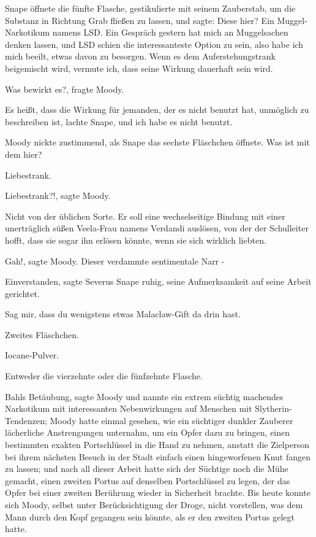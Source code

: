 Snape öffnete die fünfte Flasche, gestikulierte mit seinem Zauberstab, um die
Substanz in Richtung Grab fließen zu lassen, und sagte: \glqq{}Diese hier? Ein
Muggel-Narkotikum namens LSD. Ein Gespräch gestern hat mich an Muggelsachen
denken lassen, und LSD schien die interessanteste Option zu sein, also habe ich
mich beeilt, etwas davon zu besorgen. Wenn es dem Auferstehungstrank beigemischt
wird, vermute ich, dass seine Wirkung dauerhaft sein wird.\grqq{}

\glqq{}Was bewirkt es?\grqq{}, fragte Moody.

\glqq{}Es heißt, dass die Wirkung für jemanden, der es nicht benutzt hat,
unmöglich zu beschreiben ist\grqq{}, lachte Snape, \glqq{}und ich habe es nicht
benutzt.\grqq{}

Moody nickte zustimmend, als Snape das sechste Fläschchen öffnete. \glqq{}Was ist
mit dem hier?\grqq{}

\glqq{}Liebestrank.\grqq{}

\glqq{}Liebestrank?!\grqq{}, sagte Moody.

\glqq{}Nicht von der üblichen Sorte. Er soll eine wechselseitige Bindung mit
einer unerträglich süßen Veela-Frau namens Verdandi auslösen, von der der
Schulleiter hofft, dass sie sogar ihn erlösen könnte, wenn sie sich wirklich
liebten.\grqq{}

\glqq{}Gah!\grqq{}, sagte Moody. \glqq{}Dieser verdammte sentimentale Narr
-\grqq{}

\glqq{}Einverstanden\grqq{}, sagte Severus Snape ruhig, seine Aufmerksamkeit auf
seine Arbeit gerichtet.

\glqq{}Sag mir, dass du wenigstens etwas Malaclaw-Gift da drin hast.\grqq{}

\glqq{}Zweites Fläschchen.\grqq{}

\glqq{}Iocane-Pulver.\grqq{}

\glqq{}Entweder die vierzehnte oder die fünfzehnte Flasche.\grqq{}

\glqq{}Bahls Betäubung\grqq{}, sagte Moody und nannte ein extrem süchtig
machendes Narkotikum mit interessanten Nebenwirkungen auf Menschen mit
Slytherin-Tendenzen; Moody hatte einmal gesehen, wie ein süchtiger dunkler
Zauberer lächerliche Anstrengungen unternahm, um ein Opfer dazu zu bringen,
einen bestimmten exakten Portschlüssel in die Hand zu nehmen, anstatt die
Zielperson bei ihrem nächsten Besuch in der Stadt einfach einen hingeworfenen
Knut fangen zu lassen; und nach all dieser Arbeit hatte sich der Süchtige noch
die Mühe gemacht, einen zweiten Portus auf denselben Portschlüssel zu legen, der
das Opfer bei einer zweiten Berührung wieder in Sicherheit brachte. Bis heute
konnte sich Moody, selbst unter Berücksichtigung der Droge, nicht vorstellen,
was dem Mann durch den Kopf gegangen sein könnte, als er den zweiten Portus
gelegt hatte.

